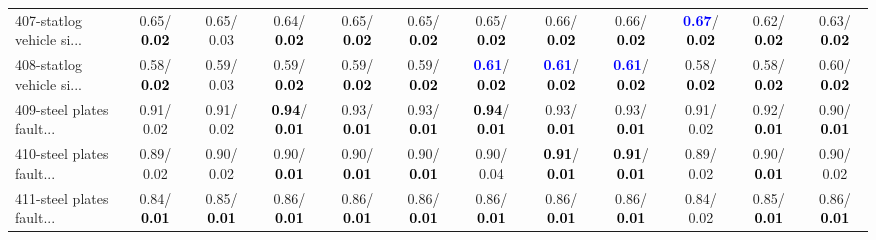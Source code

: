 \begin{table}[h]
\begin{center}
{\begin{tabular}{lc|c|c|c|c|c|c|c|c|c|c}
407-statlog vehicle si... &   0.65/\textcolor{black}{\textbf{  0.02}} &   0.65/  0.03 &   0.64/\textcolor{black}{\textbf{  0.02}} &   0.65/\textcolor{black}{\textbf{  0.02}} &   0.65/\textcolor{black}{\textbf{  0.02}} &   0.65/\textcolor{black}{\textbf{  0.02}} &   0.66/\textcolor{black}{\textbf{  0.02}} &   0.66/\textcolor{black}{\textbf{  0.02}} & \textcolor{blue}{\textbf{  0.67}}/\textcolor{black}{\textbf{  0.02}} &   0.62/\textcolor{black}{\textbf{  0.02}} &   0.63/\textcolor{black}{\textbf{  0.02}} \\
408-statlog vehicle si... &   0.58/\textcolor{black}{\textbf{  0.02}} &   0.59/  0.03 &   0.59/\textcolor{black}{\textbf{  0.02}} &   0.59/\textcolor{black}{\textbf{  0.02}} &   0.59/\textcolor{black}{\textbf{  0.02}} & \textcolor{blue}{\textbf{  0.61}}/\textcolor{black}{\textbf{  0.02}} & \textcolor{blue}{\textbf{  0.61}}/\textcolor{black}{\textbf{  0.02}} & \textcolor{blue}{\textbf{  0.61}}/\textcolor{black}{\textbf{  0.02}} &   0.58/\textcolor{black}{\textbf{  0.02}} &   0.58/\textcolor{black}{\textbf{  0.02}} &   0.60/\textcolor{black}{\textbf{  0.02}} \\
409-steel plates fault... &   0.91/  0.02 &   0.91/  0.02 & \textcolor{black}{\textbf{  0.94}}/\textcolor{black}{\textbf{  0.01}} &   0.93/\textcolor{black}{\textbf{  0.01}} &   0.93/\textcolor{black}{\textbf{  0.01}} & \textcolor{black}{\textbf{  0.94}}/\textcolor{black}{\textbf{  0.01}} &   0.93/\textcolor{black}{\textbf{  0.01}} &   0.93/\textcolor{black}{\textbf{  0.01}} &   0.91/  0.02 &   0.92/\textcolor{black}{\textbf{  0.01}} &   0.90/\textcolor{black}{\textbf{  0.01}} \\
410-steel plates fault... &   0.89/  0.02 &   0.90/  0.02 &   0.90/\textcolor{black}{\textbf{  0.01}} &   0.90/\textcolor{black}{\textbf{  0.01}} &   0.90/\textcolor{black}{\textbf{  0.01}} &   0.90/  0.04 & \textcolor{black}{\textbf{  0.91}}/\textcolor{black}{\textbf{  0.01}} & \textcolor{black}{\textbf{  0.91}}/\textcolor{black}{\textbf{  0.01}} &   0.89/  0.02 &   0.90/\textcolor{black}{\textbf{  0.01}} &   0.90/  0.02 \\
411-steel plates fault... &   0.84/\textcolor{black}{\textbf{  0.01}} &   0.85/\textcolor{black}{\textbf{  0.01}} &   0.86/\textcolor{black}{\textbf{  0.01}} &   0.86/\textcolor{black}{\textbf{  0.01}} &   0.86/\textcolor{black}{\textbf{  0.01}} &   0.86/\textcolor{black}{\textbf{  0.01}} &   0.86/\textcolor{black}{\textbf{  0.01}} &   0.86/\textcolor{black}{\textbf{  0.01}} &   0.84/  0.02 &   0.85/\textcolor{black}{\textbf{  0.01}} &   0.86/\textcolor{black}{\textbf{  0.01}} \\

\end{tabular}}
\end{center}
\end{table}
